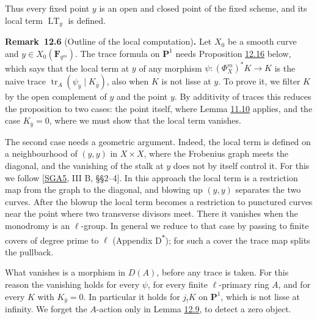 \documentclass[11pt]{article}
\newenvironment{bpstatement}[2]{\par\addvspace{0.6\baselineskip}\noindent\textbf{#1}#2\textbf{.}\enspace\ignorespaces}
  {\par\addvspace{0.4\baselineskip}}
\newcommand{\bpout}[1]{#1\textsuperscript{\hyperlink{bp-outside}{\ensuremath{\ast}}}}
\begin{document}
\label{bp242}%
Thus every fixed point \(y\) is an open and closed point of the fixed scheme, and its local term \(\operatorname{LT}_y\) is defined.

\label{bp243}%
\begin{bpstatement}{Remark~12.6}{ (Outline of the local computation)}
Let \(X_0\) be a smooth curve and \(y\in X_0(\mathbf F_{q^m})\). The trace formula on \(\mathbf P^1\) needs Proposition \hyperref[bp274]{12.16} below, which says that the local term at \(y\) of any morphism \(\psi:(\Phi_X^m)^*K\to K\) is the naive trace \(\operatorname{tr}_A(\psi_{\bar y}\mid K_{\bar y})\), also when \(K\) is not lisse at \(y\). To prove it, we filter \(K\) by the open complement of \(y\) and the point \(y\). By additivity of traces this reduces the proposition to two cases: the point itself, where Lemma \hyperref[bp199]{11.10} applies, and the case \(K_{\bar y}=0\), where we must show that the local term vanishes.

The second case needs a geometric argument. Indeed, the local term is defined on a neighbourhood of \((y,y)\) in \(X\times X\), where the Frobenius graph meets the diagonal, and the vanishing of the stalk at \(y\) does not by itself control it. For this we follow [\hyperref[bp332]{SGA5}, III B, §§2–4]. In this approach the local term is a restriction map from the graph to the diagonal, and blowing up \((y,y)\) separates the two curves. After the blowup the local term becomes a restriction to punctured curves near the point where two transverse divisors meet. There it vanishes when the monodromy is an \(\ell\)-group. In general we reduce to that case by passing to finite covers of degree prime to \(\ell\) (Appendix \bpout{D}); for such a cover the trace map splits the pullback.

What vanishes is a morphism in \(D(A)\), before any trace is taken. For this reason the vanishing holds for every \(\psi\), for every finite \(\ell\)-primary ring \(A\), and for every \(K\) with \(K_{\bar y}=0\). In particular it holds for \(j_!K\) on \(\mathbf P^1\), which is not lisse at infinity. We forget the \(A\)-action only in Lemma \hyperref[bp253]{12.9}, to detect a zero object.
\end{bpstatement}

\end{document}
